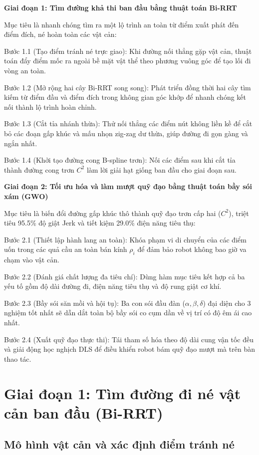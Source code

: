 \textbf{Giai đoạn 1: Tìm đường khả thi ban đầu bằng thuật toán Bi-RRT}

Mục tiêu là nhanh chóng tìm ra một lộ trình an toàn từ điểm xuất phát đến điểm đích, né hoàn toàn các vật cản:

Bước 1.1 (Tạo điểm tránh né trực giao): Khi đường nối thẳng gặp vật cản, thuật toán đẩy điểm mốc ra ngoài bề mặt vật thể theo phương vuông góc để tạo lối đi vòng an toàn.

Bước 1.2 (Mở rộng hai cây Bi-RRT song song): Phát triển đồng thời hai cây tìm kiếm từ điểm đầu và điểm đích trong không gian góc khớp để nhanh chóng kết nối thành lộ trình hoàn chỉnh.

Bước 1.3 (Cắt tỉa nhánh thừa): Thử nối thẳng các điểm nút không liền kề để cắt bỏ các đoạn gấp khúc và mấu nhọn zig-zag dư thừa, giúp đường đi gọn gàng và ngắn nhất.

Bước 1.4 (Khởi tạo đường cong B-spline trơn): Nối các điểm sau khi cắt tỉa thành đường cong trơn $C^2$ làm lời giải hạt giống ban đầu cho giai đoạn sau.

\textbf{Giai đoạn 2: Tối ưu hóa và làm mượt quỹ đạo bằng thuật toán bầy sói xám (GWO)}

Mục tiêu là biến đổi đường gấp khúc thô thành quỹ đạo trơn cấp hai ($C^2$), triệt tiêu 95.5\% độ giật Jerk và tiết kiệm 29.0\% điện năng tiêu thụ:

Bước 2.1 (Thiết lập hành lang an toàn): Khóa phạm vi di chuyển của các điểm uốn trong các quả cầu an toàn bán kính $\rho_i$ để đảm bảo robot không bao giờ va chạm vào vật cản.

Bước 2.2 (Đánh giá chất lượng đa tiêu chí): Dùng hàm mục tiêu kết hợp cả ba yếu tố gồm độ dài đường đi, điện năng tiêu thụ và độ rung giật cơ khí.

Bước 2.3 (Bầy sói săn mồi và hội tụ): Ba con sói đầu đàn ($\alpha, \beta, \delta$) đại diện cho 3 nghiệm tốt nhất sẽ dẫn dắt toàn bộ bầy sói co cụm dần về vị trí có độ êm ái cao nhất.

Bước 2.4 (Xuất quỹ đạo thực thi): Tái tham số hóa theo độ dài cung vận tốc đều và giải động học nghịch DLS để điều khiển robot bám quỹ đạo mượt mà trên bàn thao tác.

\section{Giai đoạn 1: Tìm đường đi né vật cản ban đầu (Bi-RRT)}
\label{sec:stage1_birrt}

\subsection{Mô hình vật cản và xác định điểm tránh né}

